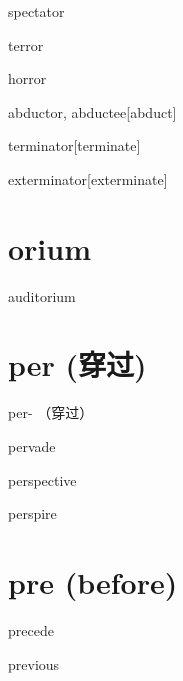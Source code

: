 \begin{RefWord}{spectator}
\end{RefWord}

\begin{RefWord}{terror}
\end{RefWord}

\begin{RefWord}{horror}
\end{RefWord}

\begin{RefWord}{abductor, abductee}[abduct]
\end{RefWord}

\begin{RefWord}{terminator}[terminate]
\end{RefWord}

\begin{RefWord}{exterminator}[exterminate]
\end{RefWord}

\section{orium}

\begin{RefWord}{auditorium}
\end{RefWord}

\section{per (穿过)}
{per- （穿过）}

\begin{RefWord}{pervade}
\end{RefWord}

\begin{RefWord}{perspective}
\end{RefWord}

\begin{RefWord}{perspire}
\end{RefWord}

\section{pre (before)}
\begin{RefWord}{precede}
\end{RefWord}

\begin{RefWord}{previous}
\end{RefWord}

